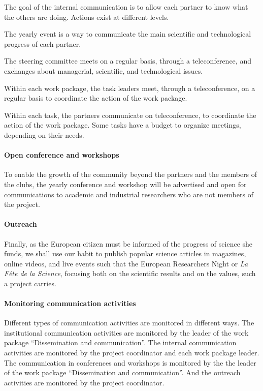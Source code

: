 The goal of the internal communication is to allow each partner to
know what the others are doing. Actions exist at different levels.

\begin{compactitem}
\item The yearly event is a way to communicate the main scientific and
  technological progress of each partner.
\item The steering committee meets on a regular basis, through a
  teleconference, and exchanges about managerial, scientific, and
  technological issues.
\item Within each work package, the task leaders meet, through a
  teleconference, on a regular basis to coordinate the action of the
  work package.
\item Within each task, the partners communicate on teleconference, to
  coordinate the action of the work package. Some tasks have a budget
  to organize meetings, depending on their needs.
\end{compactitem}

\paragraph*{Open conference and workshops}

To enable the growth of the community beyond the partners and the
members of the clubs, the yearly conference and workshop will be
advertised and open for communications to academic and industrial
researchers who are not members of the project.

\paragraph*{Outreach}

Finally, as the European citizen must be informed of the progress of
science she funds, we shall use our habit to publish popular science
articles in magazines, online videos, and live events such that the
European Researchers Night or {\em La Fête de la Science}, focusing
both on the scientific results and on the values, such a project
carries.

\paragraph*{Monitoring communication activities}

Different types of communication activities are monitored in
different ways.  The institutional communication activities are
monitored by the leader of the work package ``Dissemination and
communication''. The internal communication activities are monitored
by the project coordinator and each work package leader. The communication
in conferences and workshops is monitored by the
the leader of the work package ``Dissemination and
communication''. And the outreach activities are monitored by the
project coordinator.

